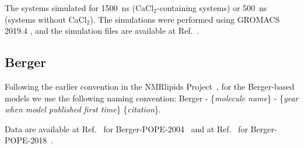 \documentclass[journal=jpcbfk]{achemso}
\begin{document}
The systems simulated for 1500~ns (CaCl$_2$-containing systems) or 500~ns (systems without CaCl$_2$). The simulations were performed using GROMACS 2019.4 \cite{abraham2015gromacs}, and the simulation files are available at Ref.~.

\subsection{Berger}

Following the earlier convention in the NMRlipids Project~\cite{botan15}, 
for the Berger-based models we use the following naming convention: 
Berger - \{{\it molecule name}\} - \{{\it year when model published first time}\} \{{\it citation}\}.

 Data are available at Ref.~ for Berger-POPE-2004~\cite{??} and at Ref.~ for Berger-POPE-2018~\cite{??}. 

\end{document}
